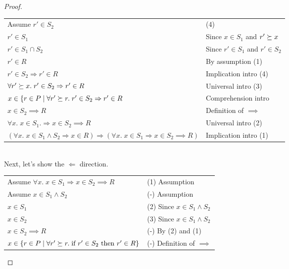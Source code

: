 \begin{proof}
\begin{tabular}{ll}
Assume $r' \in S_2$ & 
(4)
\\

$r' \in S_1$ & 
Since $x \in S_1$ and $r' \succeq x$ \\

$r' \in S_1 \cap S_2$ & 
Since $r' \in S_1$ and $r' \in S_2$ \\

$r' \in R$ &
By assumption (1) \\

$r' \in S_2 \Rightarrow r' \in R$ &
Implication intro (4) \\

$\forall r' \succeq x.\; r' \in S_2 \Rightarrow r' \in R$ &
Universal intro (3) \\

$x \in \{ r \in P \;|\; \forall r' \succeq r.\; r' \in S_2 \Rightarrow r' \in R$ &
Comprehension intro \\

$x \in S_2 \implies R$ &
Definition of $\implies$ \\

$\forall x.\; x \in S_1. \Rightarrow x \in S_2 \implies R$ &
Universal intro (2) \\

$(\forall x.\; x \in S_1 \land S_2 \Rightarrow x \in R) \Rightarrow (\forall x.\; x \in S_1 \Rightarrow x \in S_2 \implies R)$ &
Implication intro (1) \\
\end{tabular}
\\

Next, let's show the $\Leftarrow$ direction. 
\\

\begin{tabular}{ll}
Assume $\forall x.\; x \in S_1 \Rightarrow x \in S_2 \implies R$ &
(1) Assumption \\

Assume $x \in S_1 \land S_2$ & 
(-) Assumption \\

$x \in S_1$ & 
(2) Since $x \in S_1 \land S_2$ \\

$x \in S_2$ & 
(3) Since $x \in S_1 \land S_2$ \\

$x \in S_2 \implies R$ & 
(-) By (2) and (1) \\

$x \in \{ r \in P \;|\; \forall r' \succeq r.\; \mbox{if } r' \in S_2 \mbox{ then } r' \in R \}$ &
(-) Definition of $\implies$ \\


\end{tabular}
\end{proof}
